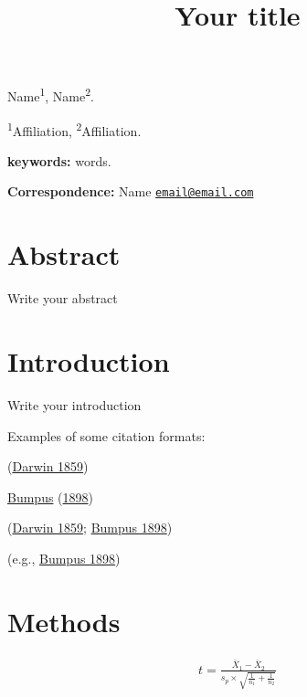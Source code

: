 \documentclass[
  12pt,
]{article}
\title{Your title}
\author{}
\date{\vspace{-2.5em}}
\begin{document}
\maketitle

Name\textsuperscript{1}, Name\textsuperscript{2}. \newline

\textsuperscript{1}Affiliation, \newline
\textsuperscript{2}Affiliation. \newline

\textbf{keywords:} words. \newline

\textbf{Correspondence:} \newline
Name \newline
\href{mailto:email@email.com}{\nolinkurl{email@email.com}} \newline

\pagebreak

\hypertarget{abstract}{%
\section*{Abstract}\label{abstract}}

Write your abstract

\pagebreak

\hypertarget{intro}{%
\section{Introduction}\label{intro}}

Write your introduction

Examples of some citation formats:

(\protect\hyperlink{ref-Darwin1859}{Darwin 1859})

\protect\hyperlink{ref-Bumpus1898}{Bumpus} (\protect\hyperlink{ref-Bumpus1898}{1898})

(\protect\hyperlink{ref-Darwin1859}{Darwin 1859}; \protect\hyperlink{ref-Bumpus1898}{Bumpus 1898})

(e.g., \protect\hyperlink{ref-Bumpus1898}{Bumpus 1898})

\hypertarget{methods}{%
\section{Methods}\label{methods}}

\begin{align}
t = \frac{\bar{X}_{1} - \bar{X}_{2}} {s_{p} \times \sqrt{\frac{1}{n_{1}} + \frac{1}{n_{2}}}} \label{eq:H1S}
\end{align}
\end{document}
